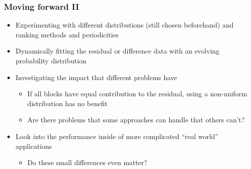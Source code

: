 \documentclass{beamer}
\begin{document}
\begin{frame}
	\frametitle{Moving forward II}
	\begin{itemize}
		\item Experimenting with different distributions (still chosen beforehand) and ranking methods and periodicities
		\item Dynamically fitting the residual or difference data with an evolving probability distribution
		\item Investigating the impact that different problems have
			\begin{itemize}
				\item If all blocks have equal contribution to the residual, using a non-uniform distribution has no benefit
				\item Are there problems that some approaches can handle that others can't?
			\end{itemize}
		\item Look into the performance inside of more complicated ``real world'' applications
			\begin{itemize}
				\item Do these small differences even matter?
			\end{itemize}
	\end{itemize}
\end{frame}
\end{document}
